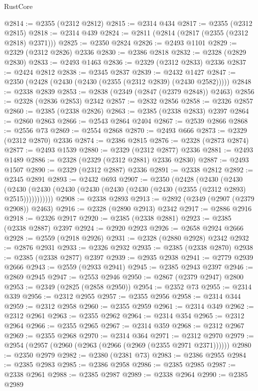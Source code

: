 \begin{lexlean}{RustCore}
\begin{coremodule}
@2814 := @2355 (@2312 @2812)
@2815 := @2314 @434
@2817 := @2355 (@2312 @2815)
@2818 := @2314 @439
@2824 := @2811 (@2814 (@2817 (@2355 (@2312 @2818) @2371)))
@2825 := @2350 @2824
@2826 := @2493 @1101
@2829 := @2329 (@2312 @2826) @2336
@2830 := @2386 @2818
@2832 := @2328 (@2829 @2830)
@2833 := @2493 @1463
@2836 := @2329 (@2312 @2833) @2336
@2837 := @2424 @2812
@2838 := @2345 @2837
@2839 := @2432 @1427
@2847 := @2350 (@2428 (@2430 (@2430 (@2355 (@2312 @2839) (@2430 @2582)))))
@2848 := @2338 @2839
@2853 := @2838 (@2349 (@2847 (@2379 @2848)) @2463)
@2856 := @2328 (@2836 @2853) @2342
@2857 := @2832 @2856
@2858 := @2326 @2857
@2860 := @2385 (@2338 @2826)
@2863 := @2385 (@2338 @2833) @2397
@2864 := @2860 @2863
@2866 := @2543 @2864 @2404
@2867 := @2539 @2866
@2868 := @2556 @73
@2869 := @2554 @2868
@2870 := @2493 @666
@2873 := @2329 (@2312 @2870) @2336
@2874 := @2386 @2815
@2876 := @2328 (@2873 @2874)
@2877 := @2493 @1539
@2880 := @2329 (@2312 @2877) @2336
@2881 := @2493 @1489
@2886 := @2328 (@2329 (@2312 @2881) @2336 @2830)
@2887 := @2493 @1507
@2890 := @2329 (@2312 @2887) @2336
@2891 := @2338 @2812
@2892 := @2345 @2891
@2893 := @2432 @693
@2907 := @2350
    (@2428
      (@2430
        (@2430
          (@2430 (@2430 (@2430 (@2430 (@2430 (@2430 (@2430 (@2355 (@2312 @2893) @2515)))))))))))
@2908 := @2338 @2893
@2913 := @2892 (@2349 (@2907 (@2379 @2908)) @2463)
@2916 := @2328 (@2890 @2913) @2342
@2917 := @2886 @2916
@2918 := @2326 @2917
@2920 := @2385 (@2338 @2881)
@2923 := @2385 (@2338 @2887) @2397
@2924 := @2920 @2923
@2926 := @2658 @2924 @2666
@2928 := @2559 (@2918 @2926)
@2931 := @2328 (@2880 @2928) @2342
@2932 := @2876 @2931
@2933 := @2326 @2932
@2935 := @2385 (@2338 @2870)
@2938 := @2385 (@2338 @2877) @2397
@2939 := @2935 @2938
@2941 := @2779 @2939 @2666
@2943 := @2559 (@2933 @2941)
@2945 := @2385 @2943 @2397
@2946 := @2869 @2945
@2947 := @2553 @2946
@2950 := @2867 (@2379 @2947) @2800
@2953 := @2349 (@2825 (@2858 @2950))
@2954 := @2352 @73
@2955 := @2314 @339
@2956 := @2312 @2955
@2957 := @2355 @2956
@2958 := @2314 @344
@2959 := @2312 @2958
@2960 := @2355 @2959
@2961 := @2314 @349
@2962 := @2312 @2961
@2963 := @2355 @2962
@2964 := @2314 @354
@2965 := @2312 @2964
@2966 := @2355 @2965
@2967 := @2314 @359
@2968 := @2312 @2967
@2969 := @2355 @2968
@2970 := @2314 @364
@2971 := @2312 @2970
@2979 := @2954 (@2957 (@2960 (@2963 (@2966 (@2969 (@2355 @2971 @2371))))))
@2980 := @2350 @2979
@2982 := @2380 (@2381 @73)
@2983 := @2386 @2955
@2984 := @2385 @2983
@2985 := @2386 @2958
@2986 := @2385 @2985
@2987 := @2338 @2961
@2988 := @2385 @2987
@2989 := @2338 @2964
@2990 := @2385 @2989

\end{coremodule}
\end{lexlean}
